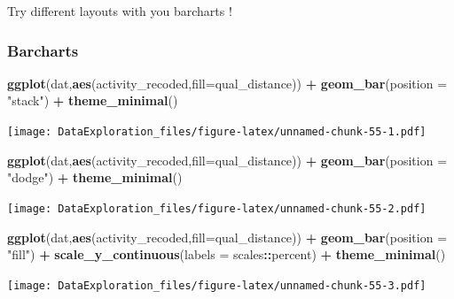 \documentclass[
]{book}
\newenvironment{Shaded}{\begin{snugshade}}{\end{snugshade}}
\newcommand{\DataTypeTok}[1]{\textcolor[rgb]{0.13,0.29,0.53}{#1}}
\newcommand{\KeywordTok}[1]{\textcolor[rgb]{0.13,0.29,0.53}{\textbf{#1}}}
\newcommand{\NormalTok}[1]{#1}
\newcommand{\OperatorTok}[1]{\textcolor[rgb]{0.81,0.36,0.00}{\textbf{#1}}}
\newcommand{\StringTok}[1]{\textcolor[rgb]{0.31,0.60,0.02}{#1}}
\begin{document}
Try different layouts with you barcharts !

\hypertarget{barcharts-1}{%
\subsubsection{Barcharts}\label{barcharts-1}}

\begin{Shaded}
\begin{Highlighting}[]
\KeywordTok{ggplot}\NormalTok{(dat,}\KeywordTok{aes}\NormalTok{(activity_recoded,}\DataTypeTok{fill=}\NormalTok{qual_distance)) }\OperatorTok{+}\StringTok{ }
\StringTok{  }\KeywordTok{geom_bar}\NormalTok{(}\DataTypeTok{position =} \StringTok{"stack"}\NormalTok{) }\OperatorTok{+}\StringTok{ }\KeywordTok{theme_minimal}\NormalTok{()}
\end{Highlighting}
\end{Shaded}

\texttt{[image: DataExploration\_files/figure-latex/unnamed-chunk-55-1.pdf]}

\begin{Shaded}
\begin{Highlighting}[]
\KeywordTok{ggplot}\NormalTok{(dat,}\KeywordTok{aes}\NormalTok{(activity_recoded,}\DataTypeTok{fill=}\NormalTok{qual_distance)) }\OperatorTok{+}\StringTok{ }
\StringTok{  }\KeywordTok{geom_bar}\NormalTok{(}\DataTypeTok{position =} \StringTok{"dodge"}\NormalTok{) }\OperatorTok{+}\StringTok{ }\KeywordTok{theme_minimal}\NormalTok{()}
\end{Highlighting}
\end{Shaded}

\texttt{[image: DataExploration\_files/figure-latex/unnamed-chunk-55-2.pdf]}

\begin{Shaded}
\begin{Highlighting}[]
\KeywordTok{ggplot}\NormalTok{(dat,}\KeywordTok{aes}\NormalTok{(activity_recoded,}\DataTypeTok{fill=}\NormalTok{qual_distance)) }\OperatorTok{+}\StringTok{ }
\StringTok{  }\KeywordTok{geom_bar}\NormalTok{(}\DataTypeTok{position =} \StringTok{"fill"}\NormalTok{) }\OperatorTok{+}\StringTok{ }
\StringTok{  }\KeywordTok{scale_y_continuous}\NormalTok{(}\DataTypeTok{labels =}\NormalTok{ scales}\OperatorTok{::}\NormalTok{percent) }\OperatorTok{+}\StringTok{ }\KeywordTok{theme_minimal}\NormalTok{()}
\end{Highlighting}
\end{Shaded}

\texttt{[image: DataExploration\_files/figure-latex/unnamed-chunk-55-3.pdf]}
\end{document}
